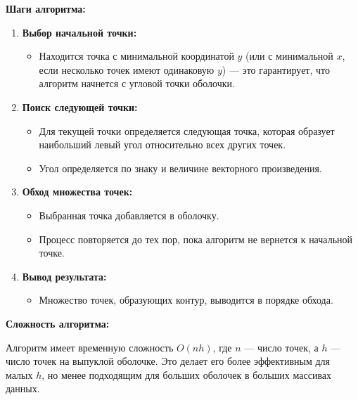 \documentclass[a4paper,12pt]{article}
\begin{document}
\textbf{Шаги алгоритма:}
\begin{enumerate}
    \item \textbf{Выбор начальной точки:} 
	\begin{itemize}
		\item Находится точка с минимальной координатой $y$ (или с минимальной $x$, если несколько точек имеют одинаковую $y$) — это гарантирует, что алгоритм начнется с угловой точки оболочки.
	\end{itemize}
    \item \textbf{Поиск следующей точки:} 
	\begin{itemize}
		\item Для текущей точки определяется следующая точка, которая образует наибольший левый угол относительно всех других точек.
		\item Угол определяется по знаку и величине векторного произведения.
	\end{itemize}
    \item \textbf{Обход множества точек:}
	\begin{itemize}
		\item Выбранная точка добавляется в оболочку.
		\item Процесс повторяется до тех пор, пока алгоритм не вернется к начальной точке.
	\end{itemize}
    \item \textbf{Вывод результата:}
	\begin{itemize}
		\item Множество точек, образующих контур, выводится в порядке обхода.
	\end{itemize}
\end{enumerate}

\textbf{Сложность алгоритма:}

Алгоритм имеет временную сложность $O(nh)$, где $n$ — число точек, а $h$ — число точек на выпуклой оболочке. Это делает его более эффективным для малых $h$, но менее подходящим для больших оболочек в больших массивах данных.

\newpage

\end{document}
